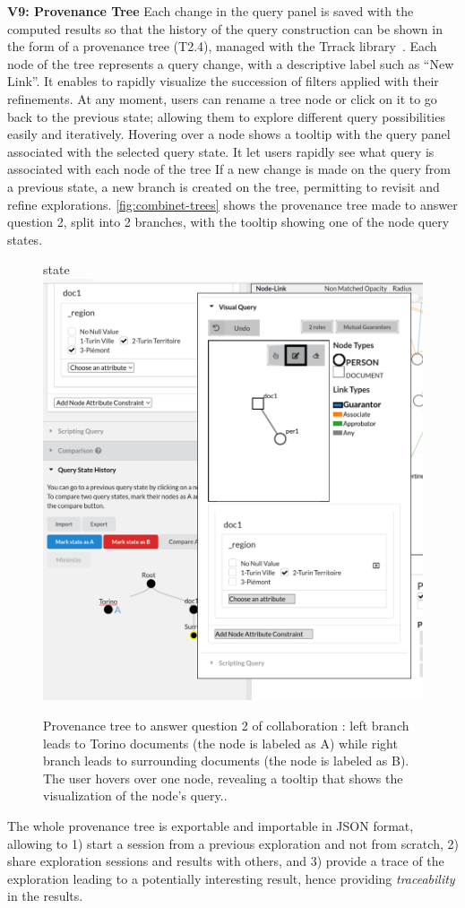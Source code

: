 \noindent\textbf{V9: Provenance Tree}
Each change in the query panel is saved with the computed results so that the history of the query construction can be shown in the form of a provenance tree (T2.4), managed with the Trrack library~\cite{cutlerTrrackLibraryProvenanceTracking2020}.
Each node of the tree represents a query change, with a descriptive label such as ``New Link''.
It enables to rapidly visualize the succession of filters applied with their refinements.
At any moment, users can rename a tree node or click on it to go back to the previous state; allowing them to explore different query possibilities easily and iteratively.
Hovering over a node shows a tooltip with the query panel associated with the selected query state.
It let users rapidly see what query is associated with each node of the tree
If a new change is made on the query from a previous state, a new branch is created on the tree, permitting to revisit and refine explorations.  \autoref{fig:combinet-trees} shows the provenance tree made to answer question 2, split into 2 branches, with the tooltip showing one of the node query states.
\begin{figure}[!ht]
     \centering
state%
     \includegraphics[width=0.5\linewidth]{static/figures/ComBiNet/tree_tooltip_torinoquery_crop}
     \caption{Provenance tree to answer question 2 of collaboration \pascal: left branch leads to Torino documents (the node is labeled as A) while right branch leads to surrounding documents (the node is labeled as B). The user hovers over one node, revealing a tooltip that shows the visualization of the node's query..}\label{fig:combinet-trees}
 \end{figure}
The whole provenance tree is exportable and importable in JSON format, allowing to 1) start a session from a previous exploration and not from scratch, 2) share exploration sessions and results with others, and 3) provide a trace of the exploration leading to a potentially interesting result, hence providing \emph{traceability} in the results.



